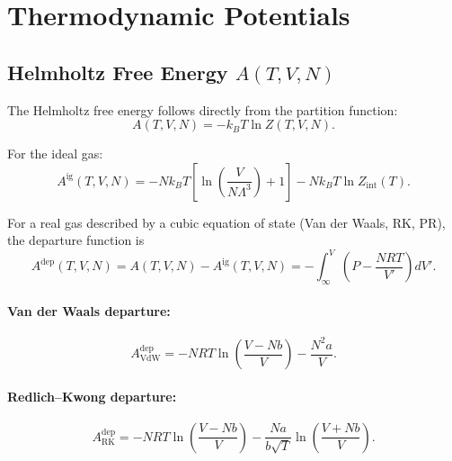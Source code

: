 \documentclass[11pt]{article}
\begin{document}
\section{Thermodynamic Potentials}

\subsection{Helmholtz Free Energy $A(T,V,N)$}

The Helmholtz free energy follows directly from the partition function:
\begin{equation}
  A(T,V,N) = -k_B T \ln Z(T,V,N).
  \label{eq:helmholtz}
\end{equation}

For the ideal gas:
\begin{equation}
  A^\mathrm{ig}(T,V,N) = -Nk_BT
    \left[\ln\!\left(\frac{V}{N\Lambda^3}\right) + 1\right]
    - Nk_BT \ln Z_\mathrm{int}(T).
  \label{eq:helmholtz_ig}
\end{equation}

For a real gas described by a cubic equation of state (Van der Waals, RK, PR),
the departure function is
\begin{equation}
  A^\mathrm{dep}(T,V,N) = A(T,V,N) - A^\mathrm{ig}(T,V,N)
    = -\int_\infty^V \left(P - \frac{NRT}{V'}\right) dV'.
  \label{eq:helmholtz_departure}
\end{equation}

\paragraph{Van der Waals departure:}
\begin{equation}
  A^\mathrm{dep}_\mathrm{VdW} = -NRT\ln\!\left(\frac{V - Nb}{V}\right)
    - \frac{N^2 a}{V}.
  \label{eq:helmholtz_vdw}
\end{equation}

\paragraph{Redlich--Kwong departure:}
\begin{equation}
  A^\mathrm{dep}_\mathrm{RK} = -NRT\ln\!\left(\frac{V - Nb}{V}\right)
    - \frac{Na}{b\sqrt{T}}\ln\!\left(\frac{V + Nb}{V}\right).
  \label{eq:helmholtz_rk}
\end{equation}
\end{document}
